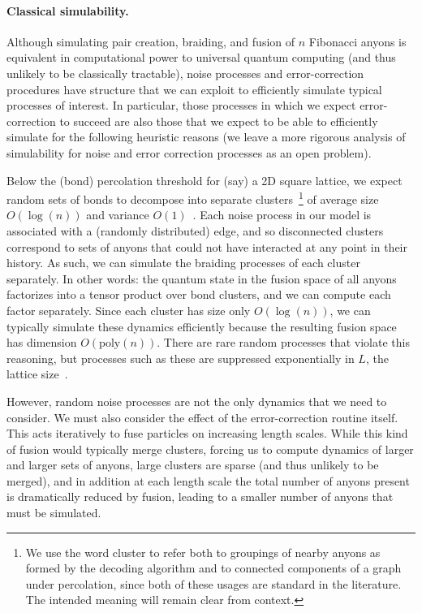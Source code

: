 \documentclass[aps, prl, letterpaper, twocolumn, superscriptaddress, notitlepage, 10pt]{revtex4-1}
\begin{document}
\paragraph{Classical simulability.}

Although simulating pair creation, braiding, and fusion of $n$ Fibonacci anyons is equivalent 
in computational power to universal quantum computing (and thus unlikely to be classically 
tractable), noise processes and error-correction procedures have structure that we can 
exploit to efficiently simulate typical processes of interest. In particular, those 
processes in which we expect error-correction to succeed are also those that we expect to 
be able to efficiently simulate for the following heuristic reasons (we leave a more rigorous analysis of simulability for noise and error correction processes as an open problem).

Below the (bond) percolation threshold for (say) a 2D square lattice, we expect random sets of 
bonds to decompose into separate clusters~\footnote{We use the word cluster to refer both to groupings of nearby anyons as formed by the decoding algorithm and to connected components of a graph under percolation, since both of these usages are standard in the literature. The intended meaning will remain clear from context.} of average size $O(\log(n))$ and variance 
$O(1)$~\cite{Bazant2000}.
Each noise process in our model is associated with a (randomly distributed) edge, and so 
disconnected clusters correspond to sets of anyons that could not have interacted at any 
point in their history. As such, we can simulate the braiding processes of each cluster 
separately. In other words: the quantum state in the fusion space of all anyons factorizes into 
a tensor product over bond clusters, and we can compute each factor separately. Since each 
cluster has size only $O(\log(n))$, we can typically simulate these dynamics efficiently 
because the resulting fusion space has dimension $O(\mathrm{poly}(n))$. There are rare 
random processes that violate this reasoning, but processes such as these are suppressed 
exponentially in $L$, the lattice size~\cite{Grimmett1989}. 

However, random noise processes are not the only dynamics that we need to consider. We 
must also consider the effect of the error-correction routine itself. This acts iteratively to fuse 
particles on increasing length scales. While this kind of fusion would typically merge clusters, 
forcing us to compute dynamics of larger and larger sets of anyons, large clusters are sparse 
(and thus unlikely to be merged), and in addition at each length scale the total number of 
anyons present is dramatically reduced by fusion, leading to a smaller number of anyons that 
must be simulated.
\end{document}
